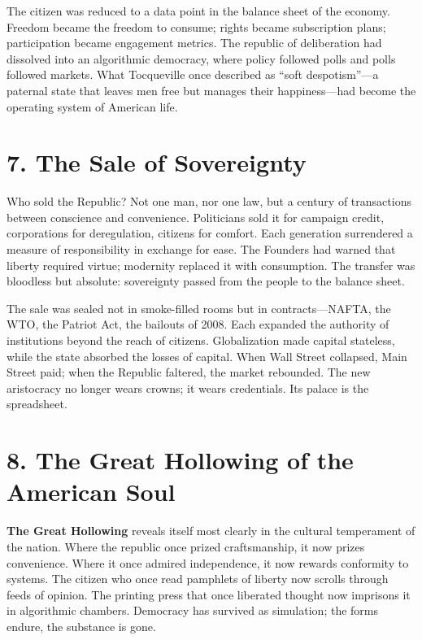 \documentclass[11pt,twoside]{book}
\begin{document}
The citizen was reduced to a data point in the balance sheet of the economy.  
Freedom became the freedom to consume; rights became subscription plans; participation became engagement metrics.  
The republic of deliberation had dissolved into an algorithmic democracy, where policy followed polls and polls followed markets.  
What Tocqueville once described as “soft despotism”—a paternal state that leaves men free but manages their happiness—had become the operating system of American life.

\section*{7. The Sale of Sovereignty}

Who sold the Republic?  
Not one man, nor one law, but a century of transactions between conscience and convenience.  
Politicians sold it for campaign credit, corporations for deregulation, citizens for comfort.  
Each generation surrendered a measure of responsibility in exchange for ease.  
The Founders had warned that liberty required virtue; modernity replaced it with consumption.  
The transfer was bloodless but absolute: sovereignty passed from the people to the balance sheet.

The sale was sealed not in smoke-filled rooms but in contracts—NAFTA, the WTO, the Patriot Act, the bailouts of 2008.  
Each expanded the authority of institutions beyond the reach of citizens.  
Globalization made capital stateless, while the state absorbed the losses of capital.  
When Wall Street collapsed, Main Street paid; when the Republic faltered, the market rebounded.  
The new aristocracy no longer wears crowns; it wears credentials.  
Its palace is the spreadsheet.

\section*{8. The Great Hollowing of the American Soul}

\textbf{The Great Hollowing} reveals itself most clearly in the cultural temperament of the nation.  
Where the republic once prized craftsmanship, it now prizes convenience.  
Where it once admired independence, it now rewards conformity to systems.  
The citizen who once read pamphlets of liberty now scrolls through feeds of opinion.  
The printing press that once liberated thought now imprisons it in algorithmic chambers.  
Democracy has survived as simulation; the forms endure, the substance is gone.
\end{document}
